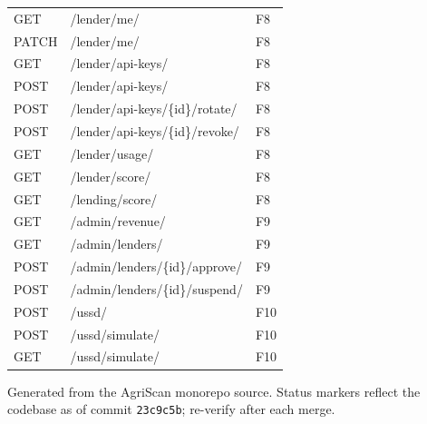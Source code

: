 \documentclass[11pt,a4paper]{article}
\begin{document}
\begin{longtable}{@{} l p{} l @{}}
GET  & /lender/me/                   & F8 \\
PATCH& /lender/me/                   & F8 \\
GET  & /lender/api-keys/             & F8 \\
POST & /lender/api-keys/             & F8 \\
POST & /lender/api-keys/\{id\}/rotate/ & F8 \\
POST & /lender/api-keys/\{id\}/revoke/  & F8 \\
GET  & /lender/usage/                & F8 \\
GET  & /lender/score/                & F8 \\
GET  & /lending/score/               & F8 \\
GET  & /admin/revenue/               & F9 \\
GET  & /admin/lenders/               & F9 \\
POST & /admin/lenders/\{id\}/approve/  & F9 \\
POST & /admin/lenders/\{id\}/suspend/  & F9 \\
POST & /ussd/                        & F10 \\
POST & /ussd/simulate/               & F10 \\
GET  & /ussd/simulate/               & F10 \\
\bottomrule
\end{longtable}
\normalsize

\vspace{2\baselineskip}
\begin{center}
\small\color{gray}
Generated from the AgriScan monorepo source. Status markers reflect the
codebase as of commit \texttt{23c9c5b}; re-verify after each merge.
\end{center}
\end{document}
